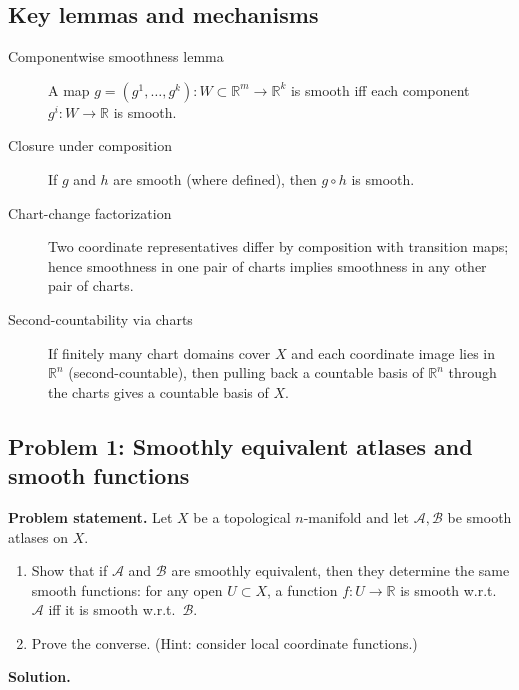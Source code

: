 \documentclass[12pt,a4paper]{article}
\theoremstyle{plain}
\theoremstyle{definition}      %
\begin{document}
\subsection*{Key lemmas and mechanisms}

\begin{description}
	\item[Componentwise smoothness lemma]
	A map $g=(g^1,\dots,g^k):W\subset\mathbb R^m\to\mathbb R^k$ is smooth iff each component $g^i:W\to\mathbb R$ is smooth.
	
	\item[Closure under composition]
	If $g$ and $h$ are smooth (where defined), then $g\circ h$ is smooth.
	
	\item[Chart-change factorization]
	Two coordinate representatives differ by composition with transition maps; hence smoothness in one pair of charts
	implies smoothness in any other pair of charts.
	
	\item[Second-countability via charts]
	If finitely many chart domains cover $X$ and each coordinate image lies in $\mathbb R^n$ (second-countable),
	then pulling back a countable basis of $\mathbb R^n$ through the charts gives a countable basis of $X$.
\end{description}



\subsection*{Problem 1: Smoothly equivalent atlases and smooth functions}

\noindent\textbf{Problem statement.}
Let $X$ be a topological $n$-manifold and let $\mathcal A,\mathcal B$ be smooth atlases on $X$.
\begin{enumerate}
	\item[(a)] Show that if $\mathcal A$ and $\mathcal B$ are smoothly equivalent, then they determine the same smooth functions:
	for any open $U\subset X$, a function $f:U\to\mathbb R$ is smooth w.r.t.\ $\mathcal A$ iff it is smooth w.r.t.\ $\mathcal B$.
	\item[(b)] Prove the converse. (Hint: consider local coordinate functions.)
\end{enumerate}

\medskip
\noindent\textbf{Solution.}
\end{document}
